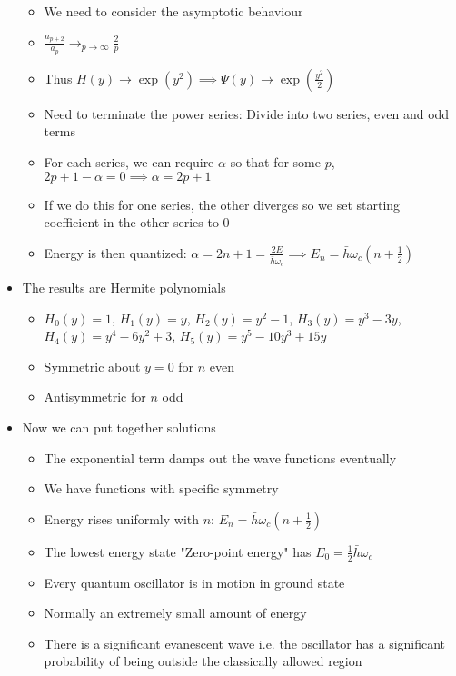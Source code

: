 \documentclass[12pt]{article}
\begin{document}
\begin{itemize}
\begin{itemize}
        \item We need to consider the asymptotic behaviour 
        \item $\frac{a_{p+2}}{a_p} \rightarrow_{p \rightarrow \infty} \frac{2}{p}$
        \item Thus $H(y) \rightarrow \exp (y^2) \implies \varPsi(y) \rightarrow \exp (\frac{y^2}{2})$
        \item Need to terminate the power series: Divide into two series, even and odd terms 
        \item For each series, we can require $\alpha$ so that for some $p$, $2p + 1 - \alpha = 0 \implies \alpha = 2p + 1$
        \item If we do this for one series, the other diverges so we set starting coefficient in the other series to 0
        \item Energy is then quantized: $\alpha = 2n+1 = \frac{2E}{\bar{h} \omega_c} \implies E_n = \bar{h} \omega_c (n + \frac{1}{2})$
    \end{itemize}
    \item The results are Hermite polynomials \begin{itemize}
        \item $H_0(y) = 1$, $H_1(y) = y$, $H_2(y) = y^2 - 1$, $H_3(y) = y^3 - 3y$, $H_4(y) = y^4 - 6y^2 + 3$, $H_5(y) = y^5 - 10y^3  +15y$
        \item Symmetric about $y = 0$ for $n$ even
        \item Antisymmetric for $n$ odd 
    \end{itemize}
    \item Now we can put together solutions \begin{itemize}
        \item The exponential term damps out the wave functions eventually 
        \item We have functions with specific symmetry 
        \item Energy rises uniformly with $n$: $E_n =\bar{h} \omega_c (n + \frac{1}{2})$
        \item The lowest energy state "Zero-point energy" has $E_0 = \frac{1}{2} \bar{h} \omega_c$
        \item Every quantum oscillator is in motion in ground state 
        \item Normally an extremely small amount of energy
        \item There is a significant evanescent wave i.e. the oscillator has a significant probability of being outside the classically allowed region 

\end{itemize}
\end{itemize}
\end{document}
